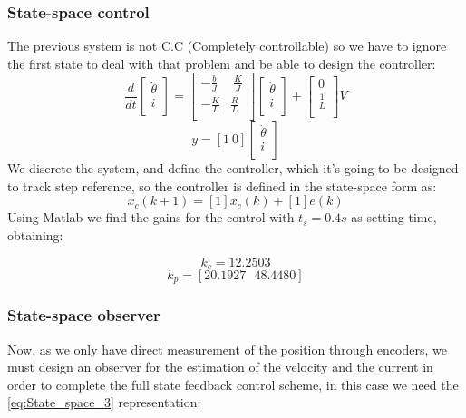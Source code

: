 \subsubsection{State-space control}
The previous system is not C.C (Completely controllable) so we have to ignore the first state to deal with that problem and be able to design the controller:
\[\frac{d}{dt}\left[\begin{matrix}\dot{\theta}\\i\\\end{matrix}\right]=\left[\begin{matrix}-\frac{b}{J}&\ \frac{K}{J}\\-\frac{K}{L}&\frac{R}{L}\\\end{matrix}\right]\left[\begin{matrix}\dot{\theta}\\i\\\end{matrix}\right]+\left[\begin{matrix}0\\\frac{1}{L}\\\end{matrix}\right]V\]
\[y=[1\ 0]\left[\begin{matrix}\dot{\theta}\\i\\\end{matrix}\right]\]
We discrete the system, and define the controller, which it's going to be designed to track step reference, so the controller is defined in the state-space form as:
\[x_c (k+1)=[1] x_c  (k)+[1]e(k)\]
Using Matlab we find the gains for the control with $t_s=0.4 s$ as setting time, obtaining:

\[k_c=12.2503\]
\[k_p=[20.1927\ \ \ 48.4480]\]

\subsubsection{State-space observer}

Now, as we only have direct measurement of the position through encoders, we must design an observer for the estimation of the velocity and the current in order to complete the full state feedback control scheme, in this case we need the \ref{eq:State_space_3} representation:

